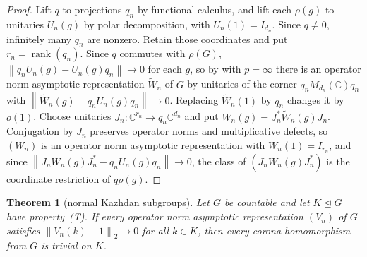 \documentclass[11pt]{amsart}
\newcommand{\leanverified}[2]{\ignorespaces}
\newtheorem{theorem}{Theorem}[section]
\theoremstyle{plain}
\newcommand{\C}{\mathbb C}
\newcommand{\opnorm}[1]{\left\lVert #1\right\rVert}
\newcommand{\hsnorm}[1]{\left\lVert #1\right\rVert_2}
\begin{document}
\begin{proof}
Lift \(q\) to projections \(q_n\) by functional calculus, and lift each
\(\rho(g)\) to unitaries \(U_n(g)\) by polar decomposition, with
\(U_n(1)=I_{d_n}\).  Since \(q\ne0\), infinitely many \(q_n\) are nonzero.
Retain those coordinates and put \(r_n=\operatorname{rank}(q_n)\).  Since
\(q\) commutes with \(\rho(G)\), \(\opnorm{q_nU_n(g)-U_n(g)q_n}\to0\)
for each \(g\), so by \cite[Proposition~2.4]{BDL} with \(p=\infty\)
there is an operator norm asymptotic representation \(\widetilde W_n\)
of \(G\) by unitaries of the corner \(q_nM_{d_n}(\C)q_n\) with
\(\opnorm{\widetilde W_n(g)-q_nU_n(g)q_n}\to0\).  Replacing
\(\widetilde W_n(1)\) by \(q_n\) changes it by \(o(1)\).  Choose unitaries
\(J_n\colon\C^{r_n}\to q_n\C^{d_n}\) and put
\(W_n(g)=J_n^*\widetilde W_n(g)J_n\).  Conjugation by \(J_n\) preserves
operator norms and multiplicative defects, so \((W_n)\) is an operator
norm asymptotic representation with \(W_n(1)=I_{r_n}\), and since
\(\opnorm{J_nW_n(g)J_n^*-q_nU_n(g)q_n}\to0\), the class of
\((J_nW_n(g)J_n^*)\) is the coordinate restriction of \(q\rho(g)\).
\end{proof}

\begin{theorem}[normal Kazhdan subgroups]\label{thm:normal-kazhdan}
Let \(G\) be countable and let \(K\trianglelefteq G\) have
property~\textup{(T)}.  If every operator norm asymptotic representation
\((V_n)\) of \(G\) satisfies \(\hsnorm{V_n(k)-1}\to0\) for all \(k\in K\),
then every corona homomorphism from \(G\) is trivial on \(K\).
\leanverified{Manuscript/OneSidedMFRadical/NormalKazhdan}{GroupApproximation.Manuscript.OneSidedMFRadical.manuscriptNormalKazhdanRadical}
\end{theorem}
\end{document}
